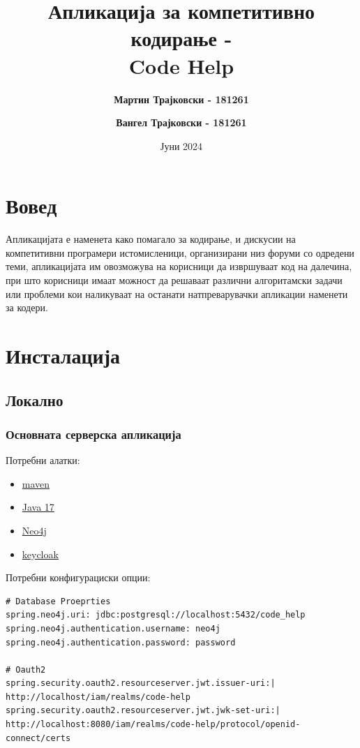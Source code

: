 \documentclass{article}
\title{Апликација за компетитивно кодирање - \\ Code Help}
\author{
    \textbf{Мартин Трајковски - 181261}
    \and
    \textbf{Вангел Трајковски - 181261}
}
\date{Јуни 2024}
\begin{document}
\maketitle
\thispagestyle{empty}

\newpage
\tableofcontents
\thispagestyle{empty}
\newpage

\section{Вовед}

Апликацијата е наменета како помагало за кодирање, и дискусии на компетитивни програмери истомисленици, организирани низ форуми со одредени теми, апликацијата им овозможува на корисници да извршуваат код на далечина, при што корисници имаат можност да решаваат различни алгоритамски задачи или проблеми кои наликуваат на останати натпреварувачки апликации наменети за кодери.

\section{Инсталација}

\subsection{Локално}

\subsubsection{Основната серверска апликација}
Потребни алатки:\begin{itemize}
\item \href{https://maven.apache.org/}{maven}
\item \href{https://openjdk.org/}{Java 17}
\item \href{https://neo4j.com/}{Neo4j}
\item \href{https://www.keycloak.org/}{keycloak}
\end{itemize}
Потребни конфигурациски опции:
\begin{lstlisting}[language=properties]
# Database Proeprties
spring.neo4j.uri: jdbc:postgresql://localhost:5432/code_help
spring.neo4j.authentication.username: neo4j
spring.neo4j.authentication.password: password

# Oauth2
spring.security.oauth2.resourceserver.jwt.issuer-uri:|
http://localhost/iam/realms/code-help
spring.security.oauth2.resourceserver.jwt.jwk-set-uri:|
http://localhost:8080/iam/realms/code-help/protocol/openid-connect/certs
\end{lstlisting}
\end{document}
